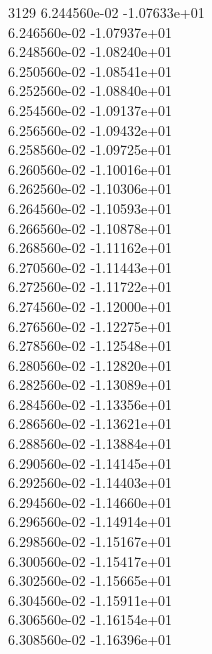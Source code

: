 3129	6.244560e-02	-1.07633e+01	\\ 	6.246560e-02	-1.07937e+01	\\ 	6.248560e-02	-1.08240e+01	\\ 	6.250560e-02	-1.08541e+01	\\ 	6.252560e-02	-1.08840e+01	\\ 	6.254560e-02	-1.09137e+01	\\ 	6.256560e-02	-1.09432e+01	\\ 	6.258560e-02	-1.09725e+01	\\ 	6.260560e-02	-1.10016e+01	\\ 	6.262560e-02	-1.10306e+01	\\ 	6.264560e-02	-1.10593e+01	\\ 	6.266560e-02	-1.10878e+01	\\ 	6.268560e-02	-1.11162e+01	\\ 	6.270560e-02	-1.11443e+01	\\ 	6.272560e-02	-1.11722e+01	\\ 	6.274560e-02	-1.12000e+01	\\ 	6.276560e-02	-1.12275e+01	\\ 	6.278560e-02	-1.12548e+01	\\ 	6.280560e-02	-1.12820e+01	\\ 	6.282560e-02	-1.13089e+01	\\ 	6.284560e-02	-1.13356e+01	\\ 	6.286560e-02	-1.13621e+01	\\ 	6.288560e-02	-1.13884e+01	\\ 	6.290560e-02	-1.14145e+01	\\ 	6.292560e-02	-1.14403e+01	\\ 	6.294560e-02	-1.14660e+01	\\ 	6.296560e-02	-1.14914e+01	\\ 	6.298560e-02	-1.15167e+01	\\ 	6.300560e-02	-1.15417e+01	\\ 	6.302560e-02	-1.15665e+01	\\ 	6.304560e-02	-1.15911e+01	\\ 	6.306560e-02	-1.16154e+01	\\ 	6.308560e-02	-1.16396e+01	\\ \hline
